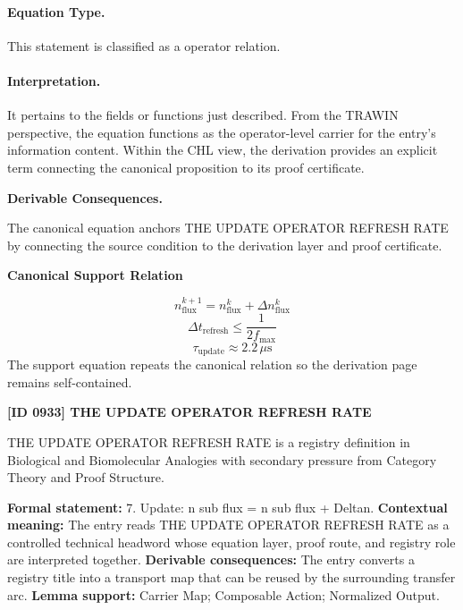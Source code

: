 \paragraph{Equation Type.}
This statement is classified as a operator relation.

\paragraph{Interpretation.}
It pertains to the fields or functions just described. From the TRAWIN perspective, the equation functions as the operator-level carrier for the entry’s information content. Within the CHL view, the derivation provides an explicit term connecting the canonical proposition to its proof certificate.

\par\vspace{0.35em}
\noindent\textbf{Derivable Consequences.}\quad
\begingroup
\footnotesize
\raggedright
The canonical equation anchors THE UPDATE OPERATOR REFRESH RATE by connecting the source condition to the derivation layer and proof certificate.
\par\endgroup

\noindent\textbf{Canonical Support Relation}\par
\[
n_{\mathrm{flux}}^{k+1}=n_{\mathrm{flux}}^{k}+\Delta n_{\mathrm{flux}}^{k}
\]
\[
\Delta t_{\mathrm{refresh}}\leq \frac{1}{2f_{\max}}
\]
\[
\tau_{\mathrm{update}}\approx 2.2\,\mu\mathrm{s}
\]
\noindent The support equation repeats the canonical relation so the derivation page remains self-contained.\par

\clearpage
\noindent\textbf{[ID 0933] THE UPDATE OPERATOR REFRESH RATE}\par
\vspace{0.35em}
\begingroup\small
{}
THE UPDATE OPERATOR REFRESH RATE is a registry definition in Biological and Biomolecular Analogies with secondary pressure from Category Theory and Proof Structure.

\begingroup\footnotesize\setlength{\emergencystretch}{3em}\sloppy
\textbf{Formal statement:} 7. Update: n sub flux = n sub flux + Deltan. \textbf{Contextual meaning:} The entry reads THE UPDATE OPERATOR REFRESH RATE as a controlled technical headword whose equation layer, proof route, and registry role are interpreted together. \textbf{Derivable consequences:} The entry converts a registry title into a transport map that can be reused by the surrounding transfer arc. \textbf{Lemma support:} Carrier Map; Composable Action; Normalized Output.\par
\endgroup

